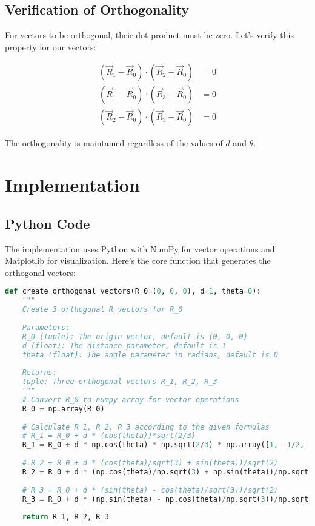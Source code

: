 \documentclass{article}
\begin{document}
\subsection{Verification of Orthogonality}
For vectors to be orthogonal, their dot product must be zero. Let's verify this property for our vectors:

\begin{align}
(\vec{R}_1 - \vec{R}_0) \cdot (\vec{R}_2 - \vec{R}_0) &= 0 \\
(\vec{R}_1 - \vec{R}_0) \cdot (\vec{R}_3 - \vec{R}_0) &= 0 \\
(\vec{R}_2 - \vec{R}_0) \cdot (\vec{R}_3 - \vec{R}_0) &= 0
\end{align}

The orthogonality is maintained regardless of the values of $d$ and $\theta$.

\section{Implementation}

\subsection{Python Code}
The implementation uses Python with NumPy for vector operations and Matplotlib for visualization. Here's the core function that generates the orthogonal vectors:

\begin{lstlisting}[language=Python, caption=Orthogonal Vectors Generation]
def create_orthogonal_vectors(R_0=(0, 0, 0), d=1, theta=0):
    """
    Create 3 orthogonal R vectors for R_0
    
    Parameters:
    R_0 (tuple): The origin vector, default is (0, 0, 0)
    d (float): The distance parameter, default is 1
    theta (float): The angle parameter in radians, default is 0
    
    Returns:
    tuple: Three orthogonal vectors R_1, R_2, R_3
    """
    # Convert R_0 to numpy array for vector operations
    R_0 = np.array(R_0)
    
    # Calculate R_1, R_2, R_3 according to the given formulas
    # R_1 = R_0 + d * (cos(theta))*sqrt(2/3)
    R_1 = R_0 + d * np.cos(theta) * np.sqrt(2/3) * np.array([1, -1/2, -1/2])
    
    # R_2 = R_0 + d * (cos(theta)/sqrt(3) + sin(theta))/sqrt(2)
    R_2 = R_0 + d * (np.cos(theta)/np.sqrt(3) + np.sin(theta))/np.sqrt(2) * np.array([1, 1, 1])
    
    # R_3 = R_0 + d * (sin(theta) - cos(theta)/sqrt(3))/sqrt(2)
    R_3 = R_0 + d * (np.sin(theta) - np.cos(theta)/np.sqrt(3))/np.sqrt(2) * np.array([0, -1/2, 1/2]) * np.sqrt(2)
    
    return R_1, R_2, R_3
\end{lstlisting}
\end{document}
